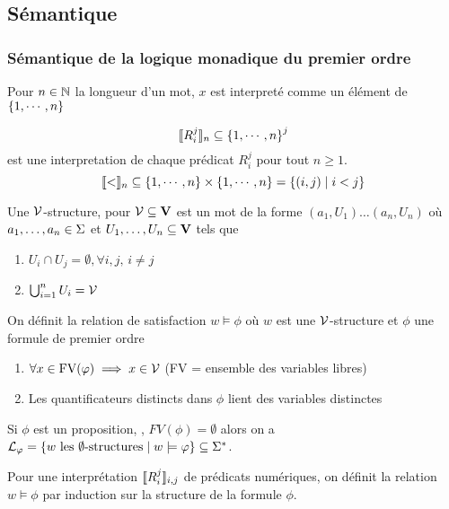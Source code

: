 \subsection{Sémantique}

\subsubsection{Sémantique de la logique monadique du premier ordre}

Pour $n \in \mathbb{N}$ la longueur d'un mot, $x$ est interpreté comme un élément de $\left\{1, \cdots, n\right\}$

$$ \llbracket R_i^j \rrbracket_n \subseteq \left\{1, \cdots, n\right\}^j$$
est une interpretation de chaque prédicat $R_i^j$ pour tout $n \geq 1$.
$$ \llbracket < \rrbracket_n \subseteq \left\{1, \cdots, n\right\} \times \left\{1, \cdots, n\right\} = \left\{(i,j) \mid i<j\right\}$$


\begin{definition}
	Une $\mathcal{V}$-structure, pour $\mathcal{V} \subseteq \mathbf{V}$ est un mot de la forme $(a_1, U_1) \ldots (a_n, U_n)$ où $a_1, \ldots, a_n \in \Sigma$ et
	$U_1, \ldots, U_n \subseteq \mathbf{V}$ tels que

	\begin{enumerate}
		\item $U_i \cap U_j = \emptyset, \forall i,j, \, i \neq j$
		\item  $\bigcup_{i=1}^n U_i = \mathcal{V}$
	\end{enumerate}
\end{definition}

\begin{definition}
	On définit la relation de satisfaction $w \models \phi$ où $w$ est une $\mathcal{V}$-structure et $\phi$ une formule de premier ordre \tq
	\begin{enumerate}
		\item $\forall x \in \text{FV}(\varphi) \implies x \in \mathcal{V}$ (FV = ensemble des variables libres)
		\item Les quantificateurs distincts dans $\phi$ lient des variables distinctes
	\end{enumerate}
\end{definition}

Si $\phi$ est un proposition, \cad, $FV(\phi) = \emptyset$ alors on a $\mathcal{L}_{\varphi} = \left\{w \text { les } \emptyset\text{-structures} \mid w \models \varphi\right\} \subseteq \Sigma^{*}$.


Pour une interprétation $\llbracket R_i^j \rrbracket_{{i,j}}$ de prédicats numériques, on définit la relation $w \models \phi$ par induction sur la structure de la formule $\phi$.

